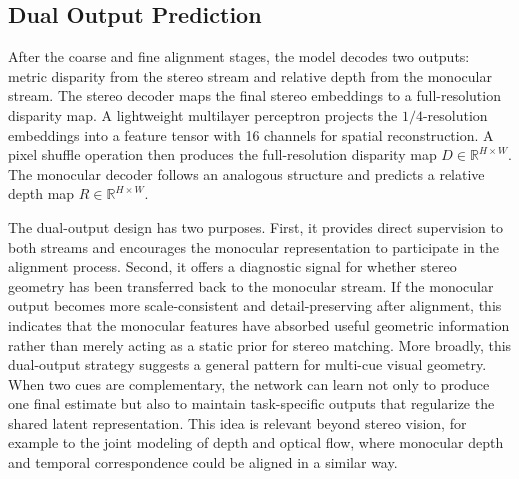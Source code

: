 \subsection{Dual Output Prediction}
After the coarse and fine alignment stages, the model decodes two outputs: metric disparity from the stereo stream and relative depth from the monocular stream.
The stereo decoder maps the final stereo embeddings to a full-resolution disparity map.
A lightweight multilayer perceptron projects the $1/4$-resolution embeddings into a feature tensor with 16 channels for spatial reconstruction. 
A pixel shuffle operation then produces the full-resolution disparity map $D \in \mathbb{R}^{H \times W}$.
The monocular decoder follows an analogous structure and predicts a relative depth map $R \in \mathbb{R}^{H \times W}$.

The dual-output design has two purposes.
First, it provides direct supervision to both streams and encourages the monocular representation to participate in the alignment process.
Second, it offers a diagnostic signal for whether stereo geometry has been transferred back to the monocular stream.
If the monocular output becomes more scale-consistent and detail-preserving after alignment, this indicates that the monocular features have absorbed useful geometric information rather than merely acting as a static prior for stereo matching.
More broadly, this dual-output strategy suggests a general pattern for multi-cue visual geometry.
When two cues are complementary, the network can learn not only to produce one final estimate but also to maintain task-specific outputs that regularize the shared latent representation.
This idea is relevant beyond stereo vision, for example to the joint modeling of depth and optical flow, where monocular depth and temporal correspondence could be aligned in a similar way.

